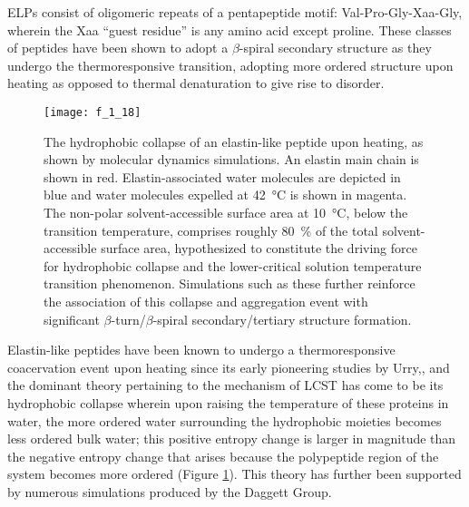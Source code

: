\begin{refsection}
ELPs consist of oligomeric repeats of a pentapeptide motif:
Val-Pro-Gly-Xaa-Gly, wherein the Xaa ``guest residue'' is any amino acid except
proline. These classes of peptides have been shown to adopt a ${\beta}$-spiral
secondary structure as they undergo the thermoresponsive transition, adopting 
more ordered structure upon heating as opposed to thermal denaturation to give
rise to disorder.\cite{Urry1988,Urry1986,Urry1985}
\begin{figure}[h!] \centering \texttt{[image: f\_1\_18]}
    \caption[The hydrophobic
        collapse of an elastin-like peptide upon heating, as shown by molecular
        dynamics simulations. An elastin main chain is shown in red.
        Elastin-associated water molecules are depicted in blue and water
        molecules expelled at \SI{42}{\celsius} is shown in magenta. The
        non-polar solvent-accessible surface area at \SI{10}{\celsius}, below
        the transition temperature, comprises roughly \SI{80}{\percent} of the
        total solvent-accessible surface area, hypothesized to constitute the
        driving force for hydrophobic collapse and the lower-critical solution
        temperature transition phenomenon. Simulations such as these further
        reinforce the association of this collapse and aggregation event with
        significant ${\beta}$-turn/${\beta}$-spiral secondary/tertiary structure
        formation.]{The hydrophobic
        collapse of an elastin-like peptide upon heating, as shown by molecular
        dynamics simulations. An elastin main chain is shown in red.
        Elastin-associated water molecules are depicted in blue and water
        molecules expelled at \SI{42}{\celsius} is shown in magenta. The
        non-polar solvent-accessible surface area at \SI{10}{\celsius}, below
        the transition temperature, comprises roughly \SI{80}{\percent} of the
        total solvent-accessible surface area, hypothesized to constitute the
        driving force for hydrophobic collapse and the lower-critical solution
        temperature transition phenomenon. Simulations such as these further
        reinforce the association of this collapse and aggregation event with
        significant ${\beta}$-turn/${\beta}$-spiral secondary/tertiary structure
        formation.\cite{Li2001}}\label{fig:elastin_diagram}
    \end{figure}
Elastin-like peptides have been known to undergo a thermoresponsive coacervation
event upon heating since its early pioneering studies by
Urry,\cite{URRY1974,Urry1985}, and the dominant theory pertaining to the
mechanism of LCST has come to be its hydrophobic collapse wherein upon raising
the temperature of these proteins in water, the more ordered water surrounding
the hydrophobic moieties becomes less ordered bulk water; this positive entropy
change is larger in magnitude than the negative entropy change that arises
because the polypeptide region of the system becomes more
ordered (Figure \ref{fig:elastin_diagram}).\cite{Urry1993} This theory has further been supported by numerous
simulations produced by the Daggett Group.\cite{Li2001,Li2003,Li2001a,Li2002a}


\end{refsection}
